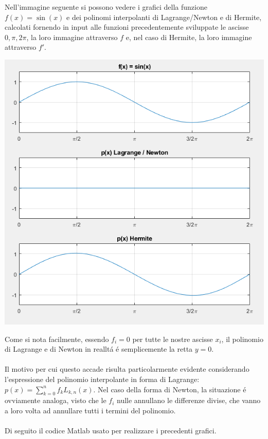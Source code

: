 \begin{center}
\footnotesize\noindent{}\end{center}

\noindent Nell'immagine seguente si possono vedere i grafici della funzione \(f(x) = \sin(x)\) e dei polinomi interpolanti di Lagrange/Newton e di Hermite, calcolati fornendo in input alle funzioni precedentemente sviluppate le ascisse \(0, \pi, 2\pi \), la loro immagine attraverso \(f\) e, nel caso di Hermite, la loro immagine attraverso \(f'\).

\begin{center}
	\includegraphics[scale=0.7]{cap4/4_4.png}
\end{center}

\noindent Come si nota facilmente, essendo \(f_i=0\) per tutte le nostre ascisse \(x_i\), il polinomio di Lagrange e di Newton in reallt\'a \'e semplicemente la retta \(y=0\). \\ \\
\noindent Il motivo per cui questo accade risulta particolarmente evidente considerando l'espressione del polinomio interpolante in forma di Lagrange: \( p(x) = \sum_{k=0}^{n}f_{k}L_{k,n}(x) \). Nel caso della forma di Newton, la situazione \'e ovviamente analoga, visto che le \(f_i\) nulle annullano le differenze divise, che vanno a loro volta ad annullare tutti i termini del polinomio. \\ \\
\noindent Di seguito il codice Matlab usato per realizzare i precedenti grafici.


